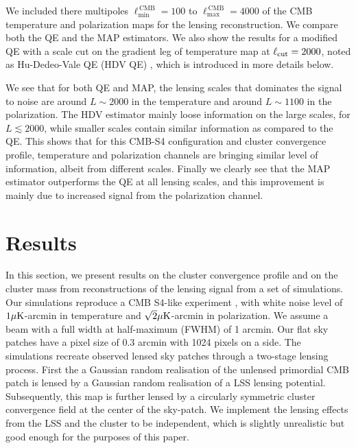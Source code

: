 \documentclass[prd, superscriptaddress, tightenlines, longbibliography, nofootinbib, eqsecnum, amsfonts, amsmath, floatfix, twocolumn, notitlepage]{revtex4-2}
\begin{document}
We included there multipoles $\ell_{\text{min}}^{\, \text{CMB}} = 100$ to $\ell_{\text{max}}^{\, \text{CMB}} = 4000$ of the CMB temperature and polarization maps for the lensing reconstruction. 
We compare both the QE and the MAP estimators. We also show the results for a modified QE with a scale cut on the gradient leg of temperature map at $\ell_{\rm cut}=2000$,  noted as Hu-Dedeo-Vale QE (HDV QE) \cite{Hu:2007bt} , which is introduced in more details below.

We see that for both QE and MAP, the lensing scales that dominates the signal to noise are around $L\sim 2000$ in the temperature and around  $L\sim 1100$ in the polarization. The HDV estimator mainly loose information on the large scales, for $L \lesssim 2000$, while smaller scales contain similar information as compared to the QE.
This shows that for this CMB-S4 configuration and cluster convergence profile, temperature and polarization channels are bringing similar level of information, albeit from different scales.  
Finally we clearly see that the MAP estimator outperforms the QE at all lensing scales, and this improvement is mainly due to increased signal from the polarization channel. 

\section{Results}
\label{sec:results}
In this section, we present results on the cluster convergence profile and on the cluster mass from reconstructions of the lensing signal from a set of simulations. 
Our simulations reproduce a CMB S4-like experiment \cite{CMB-S4:2016ple}, with white noise level of  $1 \mu \rm{K}$-arcmin in temperature and $\sqrt{2} \mu \rm{K}$-arcmin in polarization. We assume a beam with a full width at half-maximum (FWHM) of 1 arcmin.
Our flat sky patches have a pixel size of $0.3$ arcmin with 1024 pixels on a side. The simulations recreate observed lensed sky patches through a two-stage lensing process. First the a Gaussian random realisation of the unlensed primordial CMB patch is lensed by a Gaussian random realisation of a LSS lensing potential. Subsequently, this map is further lensed by a circularly symmetric cluster convergence field at the center of the sky-patch. We implement the lensing effects from the LSS and the cluster to be independent, which is slightly unrealistic but good enough for the purposes of this paper.
\end{document}
